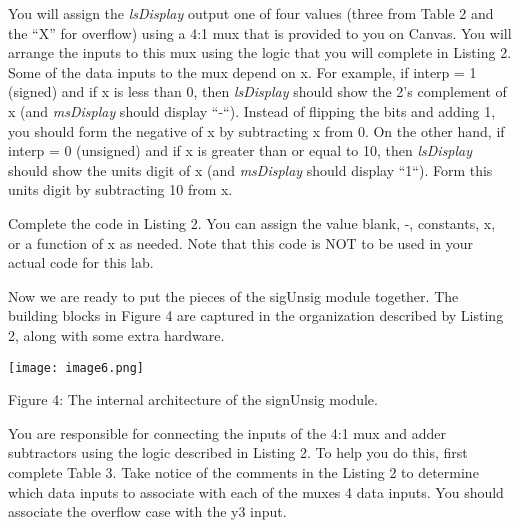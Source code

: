 You will assign the \emph{lsDisplay} output one of four values (three
from Table 2 and the ``X'' for overflow) using a 4:1 mux that is
provided to you on Canvas. You will arrange the inputs to this mux using
the logic that you will complete in Listing 2. Some of the data inputs
to the mux depend on x. For example, if interp = 1 (signed) and if x is
less than 0, then \emph{lsDisplay} should show the 2's complement of x
(and \emph{msDisplay} should display ``-``). Instead of flipping the
bits and adding 1, you should form the negative of x by subtracting x
from 0. On the other hand, if interp = 0 (unsigned) and if x is greater
than or equal to 10, then \emph{lsDisplay} should show the units digit
of x (and \emph{msDisplay} should display ``1``). Form this units digit
by subtracting 10 from x.

Complete the code in Listing 2. You can assign the value blank, -,
constants, x, or a function of x as needed. Note that this code is NOT
to be used in your actual code for this lab.

Now we are ready to put the pieces of the sigUnsig module together. The
building blocks in Figure 4 are captured in the organization described
by Listing 2, along with some extra hardware.

\texttt{[image:  image6.png]}

Figure 4: The internal architecture of the signUnsig module.

You are responsible for connecting the inputs of the 4:1 mux and adder
subtractors using the logic described in Listing 2. To help you do this,
first complete Table 3. Take notice of the comments in the Listing 2 to
determine which data inputs to associate with each of the muxes 4 data
inputs. You should associate the overflow case with the y3 input.

